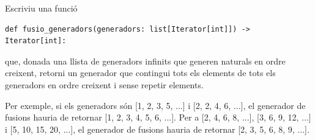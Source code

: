 
\UsePython

\Statement

Escriviu una funció 

\begin{lstlisting}
def fusio_generadors(generadors: list[Iterator[int]]) -> Iterator[int]:
\end{lstlisting}\vspace*{-6mm}    

que, donada una llista de generadors infinits que generen naturals en ordre creixent, retorni un generador que contingui tots els elements de tots els generadors en ordre creixent i sense repetir elements.

\medskip

Per exemple, si els generadors són [1, 2, 3, 5, ...] i [2, 2, 4, 6, ...], el generador de fusions hauria de retornar [1, 2, 3, 4, 5, 6, ...]. Per a [2, 4, 6, 8, ...], [3, 6, 9, 12, ...] i [5, 10, 15, 20, ...], el generador de fusions hauria de retornar [2, 3, 5, 6, 8, 9, ...].

\medskip

\Sample
